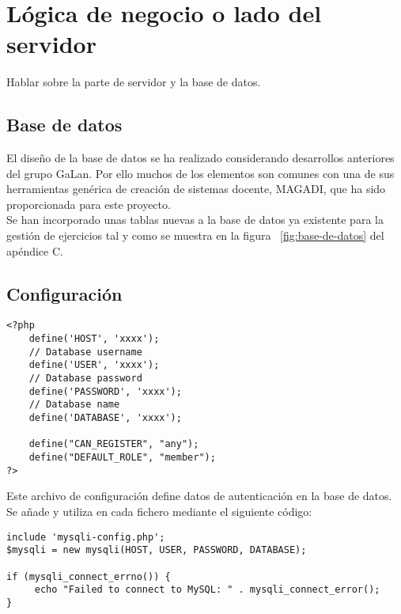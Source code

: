 \section{Lógica de negocio o lado del servidor}
\label{diseno-e-implementacion:logica-negocio}

Hablar sobre la parte de servidor y la base de datos.\\

\subsection{Base de datos}
\label{diseno-e-implementacion:logica-negocio:bd}

El diseño de la base de datos se ha realizado considerando desarrollos anteriores del grupo GaLan.
Por ello muchos de los elementos son comunes con una de sus herramientas genérica de creación
de sistemas docente, MAGADI, que ha sido proporcionada para este proyecto.\\

Se han incorporado unas tablas nuevas a la base de datos ya existente para la gestión de ejercicios tal y como se muestra en la figura ~\ref{fig:base-de-datos} del apéndice C.\\


\subsection{Configuración}
\label{diseno-e-implementacion:configuracion}

\noindent
\begin{lstlisting}[caption=Autenticación del usuario.,label={lst:autenticacion}]
<?php
	define('HOST', 'xxxx');
	// Database username
	define('USER', 'xxxx');
	// Database password
	define('PASSWORD', 'xxxx');
	// Database name
	define('DATABASE', 'xxxx'); 
	 
	define("CAN_REGISTER", "any");
	define("DEFAULT_ROLE", "member");
?>
\end{lstlisting}

Este archivo de configuración define datos de autenticación en la base de datos. Se añade y utiliza en cada fichero mediante el siguiente código:

\noindent
\begin{lstlisting}[caption=Autenticación del usuario.,label={lst:autenticacion}]
include 'mysqli-config.php';
$mysqli = new mysqli(HOST, USER, PASSWORD, DATABASE);

if (mysqli_connect_errno()) {
     echo "Failed to connect to MySQL: " . mysqli_connect_error();
}
\end{lstlisting}

